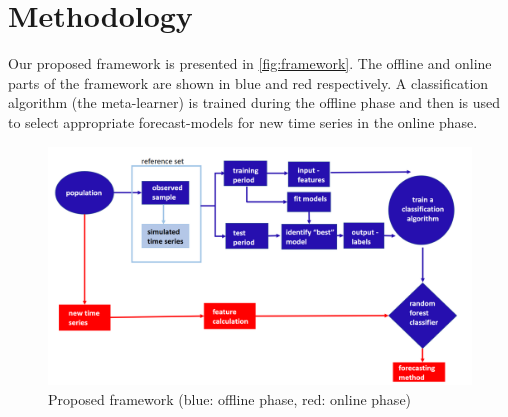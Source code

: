 \documentclass[11pt,a4paper,]{article}
\theoremstyle{definition}
\theoremstyle{definition}
\theoremstyle{definition}
\theoremstyle{remark}
\begin{document}
\section{Methodology}\label{methodology}

Our proposed framework is presented in \autoref{fig:framework}. The
offline and online parts of the framework are shown in blue and red
respectively. A classification algorithm (the meta-learner) is trained
during the offline phase and then is used to select appropriate
forecast-models for new time series in the online phase.

\begin{figure}

{\centering \includegraphics[width=\textwidth]{figures/framework} 

}

\caption{Proposed framework (blue: offline phase, red: online phase)}\label{fig:framework}
\end{figure}
\end{document}
